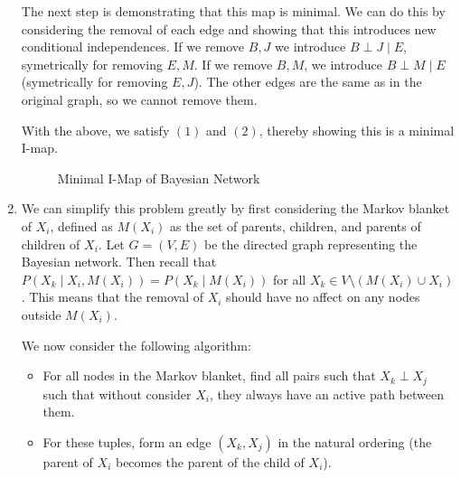 \documentclass[12pt]{article}
\begin{document}
\begin{enumerate}
The next step is demonstrating that this map is minimal. We can do this by considering the removal of each edge and showing that this introduces new conditional independences. If we remove $B,J$ we introduce $B \perp J \mid E$, symetrically for removing $E,M$. If we remove $B,M$, we introduce $B \perp M \mid E$ (symetrically for removing $E,J$). The other edges are the same as in the original graph, so we cannot remove them. 

With the above, we satisfy $(1)$ and $(2)$, thereby showing this is a minimal I-map.


\begin{figure}[h!]
\centering
{}
\centering
\caption{Minimal I-Map of Bayesian Network}
\label{fig:reduced_bayesian_network}
\end{figure}

\item We can simplify this problem greatly by first considering the Markov blanket of $X_i$, defined as $M(X_i)$ as the set of parents, children, and parents of children of $X_i$. Let $G = (V, E)$ be the directed graph representing the Bayesian network. Then recall that $P(X_k \mid X_i, M(X_i)) = P(X_k \mid M(X_i))$ for all $X_k \in V \setminus (M(X_i) \cup X_i)$. This means that the removal of $X_i$ should have no affect on any nodes outside $M(X_i)$.

We now consider the following algorithm:
\begin{itemize}
\item For all nodes in the Markov blanket, find all pairs such that $X_k \perp X_j$ such that without consider $X_i$, they always have an active path between them.
\item For these tuples, form an edge $(X_k, X_j)$ in the natural ordering (the parent of $X_i$ becomes the parent of the child of $X_i$).
\end{itemize}
\end{enumerate}
\end{document}
